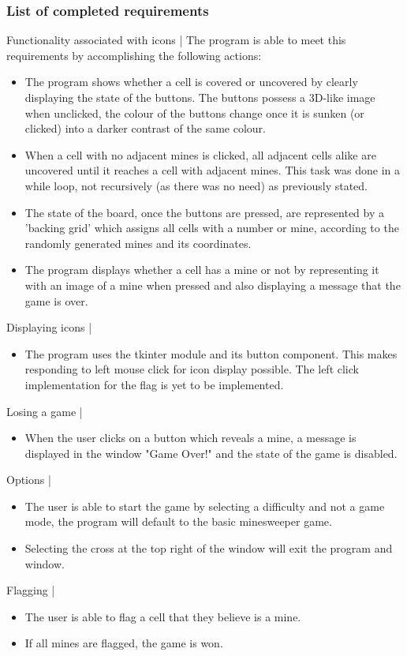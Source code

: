 \documentclass[12pt, a4]{report}
\begin{document}
		\subsubsection{List of completed requirements}
		Functionality associated with icons |
		The program is able to meet this requirements by accomplishing the following actions:
		\begin{itemize}
			\item The program shows whether a cell is covered or uncovered by clearly displaying the state of the buttons. The buttons possess a 3D-like image when unclicked, the colour of the buttons change once it is sunken (or clicked) into a darker contrast of the same colour. 
			\item When a cell with no adjacent mines is clicked, all adjacent cells alike are uncovered until it reaches a cell with adjacent mines. This task was done in a while loop, not recursively (as there was no need) as previously stated. 
			\item The state of the board, once the buttons are pressed, are represented by a 'backing grid' which assigns all cells with a number or mine, according to the randomly generated mines and its coordinates.
			\item The program displays whether a cell has a mine or not by representing it with an image of a mine when pressed and also displaying a message that the game is over.
		\end{itemize}
		\newline
		Displaying icons |
		\begin{itemize}
		\par
		\item The program uses the tkinter module and its button component. This makes responding to left mouse click for icon display possible. The left click implementation for the flag is yet to be implemented. 
		\end{itemize}
		Losing a game |
		\begin{itemize}
		\par 
		\item When the user clicks on a button which reveals a mine, a message is displayed in the window "Game Over!" and the state of the game is disabled. 
		\end{itemize}
		Options |
		\begin{itemize}
		\par 
		\item The user is able to start the game by selecting a difficulty and not a game mode, the program will default to the basic minesweeper game. 
		\item Selecting the cross at the top right of the window will exit the program and window. 
		\end{itemize}
		Flagging | 
		\begin {itemize}
		\item The user is able to flag a cell that they believe is a mine.
		\item If all mines are flagged, the game is won.
		\end{itemize}
\end{document}
